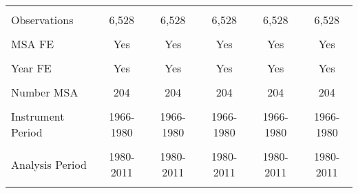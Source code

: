 \begin{tabular}{lccccc}
    \vspace{4pt} & \begin{footnotesize}\end{footnotesize} & \begin{footnotesize}\end{footnotesize} & \begin{footnotesize}\end{footnotesize} & \begin{footnotesize}\end{footnotesize} & \begin{footnotesize}\end{footnotesize} \\
    Observations & 6,528 & 6,528 & 6,528 & 6,528 & 6,528 \\
    \vspace{-2pt} & \vspace{-2pt} & \vspace{-2pt} & \vspace{-2pt} & \vspace{-2pt} \\
    MSA FE & Yes & Yes & Yes & Yes & Yes \\
    \vspace{-2pt} & \vspace{-2pt} & \vspace{-2pt} & \vspace{-2pt} & \vspace{-2pt} \\
    Year FE & Yes & Yes & Yes & Yes & Yes \\
    \vspace{-2pt} & \vspace{-2pt} & \vspace{-2pt} & \vspace{-2pt} & \vspace{-2pt} \\
    Number MSA & 204 & 204 & 204 & 204 & 204 \\
    \vspace{-2pt} & \vspace{-2pt} & \vspace{-2pt} & \vspace{-2pt} & \vspace{-2pt} \\
    Instrument Period & 1966-1980 & 1966-1980 & 1966-1980 & 1966-1980 & 1966-1980 \\
    \vspace{-2pt} & \vspace{-2pt} & \vspace{-2pt} & \vspace{-2pt} & \vspace{-2pt} \\
    Analysis Period & 1980-2011 & 1980-2011 & 1980-2011 & 1980-2011 & 1980-2011 \\ 
    \vspace{-2pt} & \vspace{-2pt} & \vspace{-2pt} & \vspace{-2pt} & \vspace{-2pt} \\ \hline
    

\end{tabular}
